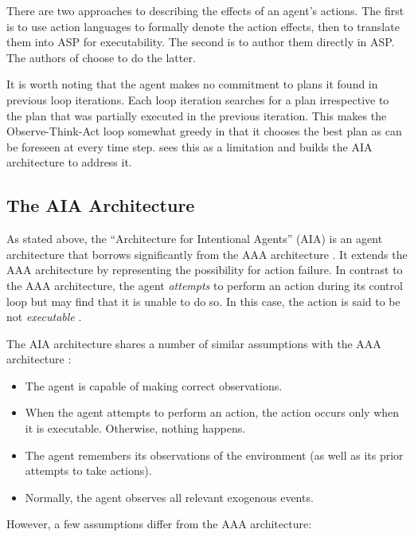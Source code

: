 There are two approaches to describing the effects of an agent's actions.
The first is to use action languages to formally denote the action effects, then to translate them into ASP for executability.
The second is to author them directly in ASP.
The authors of \cite{balduccini_aaa_2008} choose to do the latter.

It is worth noting that the agent makes no commitment to plans it found in previous loop iterations.
Each loop iteration searches for a plan irrespective to the plan that was partially executed in the previous iteration.
This makes the Observe-Think-Act loop somewhat greedy in that it chooses the best plan as can be foreseen at every time step.
\cite{blount_towards_2014} sees this as a limitation and builds the AIA architecture to address it.

\subsection{The AIA Architecture}
\label{subsec:aia_architecture}

As stated above, the ``Architecture for Intentional Agents'' (AIA) is an agent architecture that borrows significantly from the AAA architecture \cite{blount_towards_2014}.
It extends the AAA architecture by representing the possibility for action failure.
In contrast to the AAA architecture, the agent \textit{attempts} to perform an action during its control loop but may find that it is unable to do so.
In this case, the action is said to be not \textit{executable} \cite{blount_towards_2014}.

The AIA architecture shares a number of similar assumptions with the AAA architecture \cite{blount_towards_2014}:

\begin{itemize}
    \item The agent is capable of making correct observations.
    \item When the agent attempts to perform an action, the action occurs only when it is executable.
        Otherwise, nothing happens.
    \item The agent remembers its observations of the environment (as well as its prior attempts to take actions).
    \item Normally, the agent observes all relevant exogenous events.
\end{itemize}

However, a few assumptions differ from the AAA architecture:

